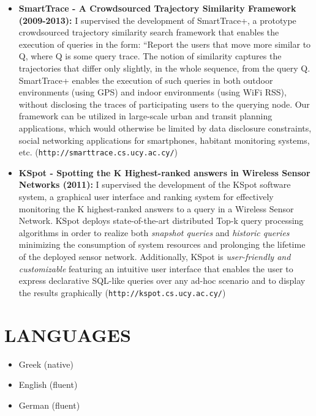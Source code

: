 \documentclass[10pt]{article}
\begin{document}
\begin{itemize}
\item
{\bf SmartTrace - A Crowdsourced Trajectory Similarity Framework (2009-2013):}
I supervised the development of SmartTrace+, a prototype crowdsourced trajectory similarity search framework that enables the execution of queries in the form: ``Report the users that move more similar to Q, where Q is some query trace. The notion of similarity captures the trajectories that differ only slightly, in the whole sequence, from the query Q. SmartTrace+ enables the execution of such queries in both outdoor environments (using GPS) and indoor environments (using WiFi RSS), without disclosing the traces of participating users to the querying node. Our framework can be utilized in large-scale urban and transit planning applications, which would otherwise be limited by data disclosure constraints, social networking applications for smartphones, habitant monitoring systems, etc.  ({\tt http://smarttrace.cs.ucy.ac.cy/})

\item
{\bf KSpot - Spotting the K Highest-ranked answers in Wireless Sensor Networks (2011):}
    I supervised the development of the KSpot software system, a graphical user interface and ranking system
    for effectively monitoring the K highest-ranked answers
    to a query in a  Wireless Sensor Network. KSpot deploys state-of-the-art distributed Top-k query processing
    algorithms in order to realize both {\em snapshot queries} and {\em historic queries}
    minimizing the consumption of system resources and prolonging the lifetime of the deployed sensor network.
    Additionally, KSpot is {\em user-friendly and customizable} featuring an intuitive user interface that enables the user to
    express declarative SQL-like queries over any ad-hoc scenario and to
    display the results graphically ({\tt http://kspot.cs.ucy.ac.cy/})


\end{itemize}


\section{\bf LANGUAGES}
\begin{itemize}
\setlength{\itemsep}{0.10ex}

\item Greek   (native)
\item English (fluent) 
\item German  (fluent) 
\end{itemize} 
\end{document}
